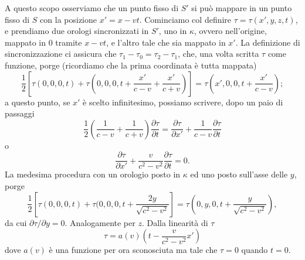 A questo scopo osserviamo che un punto fisso di $S'$ si pu\`o mappare
in un punto fisso di $S$ con la posizione $x' = x - vt $. Cominciamo
col definire $\tau = \tau (x',y,z,t)$, e prendiamo due orologi
sincronizzati in $S'$, uno in $\kappa$, ovvero nell'origine, mappato in $0$
tramite $x-vt$, e l'altro tale che sia mappato in $x'$. La definizione
di sincronizzazione ci assicura che $\tau_{1} - \tau_{0} = \tau_{2} -
\tau_{1}$, che, una volta scritta $\tau$ come funzione, porge
(ricordiamo che la prima coordinata \`e tutta mappata)
\begin{equation}
  \frac{1}{2}\left[\tau(0,0,0,t) + \tau(0,0,0,t + \frac{x'}{c-v} + 
    \frac{x'}{c+v}) \right] =
  \tau(x',0,0,t + \frac{x'}{c-v});
\end{equation}
a questo punto, se $x'$ \`e scelto infinitesimo, possiamo scrivere,
dopo un paio di passaggi
\begin{equation}
  \frac{1}{2} \left( \frac{1}{c-v} + 
    \frac{1}{c+v} \right) \frac{\partial \tau}{\partial t}
  = \frac{\partial \tau}{\partial x'} + 
  \frac{1}{c-v}\frac{\partial \tau}{\partial t}
\end{equation}
o
\begin{equation}
  \frac{\partial \tau}{\partial x'} + 
  \frac{v}{c^{2} - v^{2}} \frac{\partial \tau}{\partial t} = 0.
\end{equation}
La medesima procedura con un orologio posto in $\kappa$ ed uno posto
sull'asse delle $y$, porge
\begin{equation}
  \frac{1}{2}\left[\tau(0,0,0,t) + \tau(0,0,0,t + 
    \frac{2y}{\sqrt{c^{2} - v^{2}}} \right] =
  \tau(0,y,0,t + \frac{y}{\sqrt{c^{2}-v^{2}}}),
\end{equation}
da cui $\partial \tau / \partial y = 0$. Analogamente per $z$. Dalla
linearit\`a di $\tau$
\begin{equation}
  \tau = a(v) (t - \frac{v}{c^{2} - v^{2}}x')
\end{equation}
dove $a(v)$ \`e una funzione per ora sconosciuta ma tale che $\tau =
0$ quando $t=0$.

